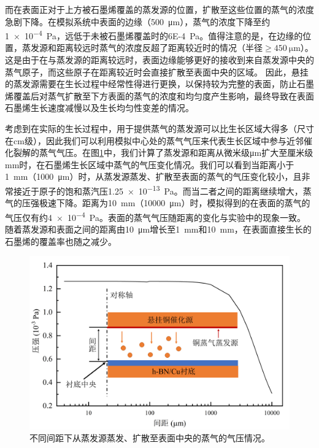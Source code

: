     而在表面正对于上方被石墨烯覆盖的蒸发源的位置，扩散至这些位置的蒸气的浓度急剧下降。在模拟系统中表面的边缘（\SI{500}{\micro\meter}），蒸气的浓度下降至约\SI{1e-4}{\pascal}，远低于未被石墨烯覆盖时的\SI{6E-4}{\pascal}。值得注意的是，在边缘的位置，蒸发源和距离较远时蒸气的浓度反超了距离较近时的情况（半径$\geqslant \SI{450}{\micro\meter}$）。这是由于在与蒸发源的距离较远时，表面边缘能够更好的接收到来自蒸发源中央的蒸气原子，而这些原子在距离较近时会直接扩散至表面中央的区域。
    因此，悬挂的蒸发源需要在生长过程中经常性得进行更换，以保持较为完整的表面，防止石墨烯覆盖后对蒸气扩散至下方表面的蒸气的浓度和均匀度产生影响，最终导致在表面石墨烯生长速度减慢以及生长均匀性变差的情况。

    考虑到在实际的生长过程中，用于提供蒸气的蒸发源可以比生长区域大得多（尺寸在\si{\centi\meter}级），因此我们可以利用模拟中心处的蒸气气压来代表生长区域中参与近邻催化裂解的蒸气气压。在图\ref{fig:CG_FEM_fullCuCenterVariousDistance}中，我们计算了蒸发源和距离从微米级\si{\micro\meter}扩大至厘米级\si{\milli\meter}时，在石墨烯生长区域中蒸气的气压变化情况。我们可以看到当距离小于\SI{1}{\milli\meter}（\SI{1000}{\micro\meter}）时，从蒸发源蒸发、扩散至表面的蒸气的气压变化较小，且非常接近于原子的饱和蒸汽压\SI{1.25e-13}{\pascal}。而当二者之间的距离继续增大，蒸气的压强极速下降。距离为\SI{10}{\milli\meter}（\SI{10000}{\micro\meter}）时，模拟得到的在表面的蒸气的气压仅有约\SI{4e-4}{\pascal}。表面的蒸气气压随距离的变化与实验中的现象一致。
    随着蒸发源和表面之间的距离由\SI{10}{\micro\meter}增长至\SI{1}{\milli\meter}和\SI{10}{\milli\meter}，在表面直接生长的石墨烯的覆盖率也随之减少。

    \begin{figure}[htb]
        \includegraphics{pic/CG_FEM_fullCuCenterVariousDistance.png}
        \caption{不同间距下从蒸发源蒸发、扩散至表面中央的蒸气的气压情况。}
        \label{fig:CG_FEM_fullCuCenterVariousDistance}
    \end{figure}

